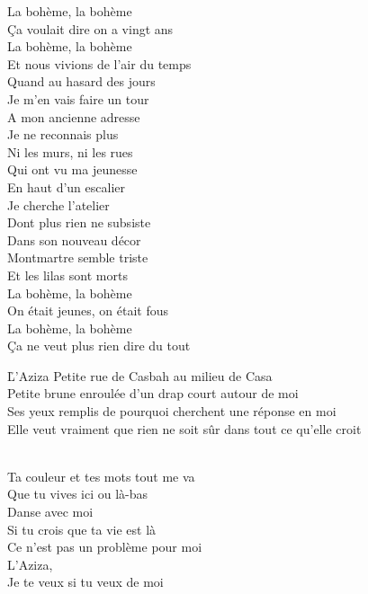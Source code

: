 \documentclass{novel}
\begin{document}
\begin{multicols}{2}
La bohème, la bohème \\
Ça voulait dire on a vingt ans \\
La bohème, la bohème \\
Et nous vivions de l'air du temps \\

Quand au hasard des jours \\
Je m'en vais faire un tour \\
A mon ancienne adresse \\
Je ne reconnais plus \\
Ni les murs, ni les rues \\
Qui ont vu ma jeunesse \\
En haut d'un escalier \\
Je cherche l'atelier \\
Dont plus rien ne subsiste \\
Dans son nouveau décor \\
Montmartre semble triste \\
Et les lilas sont morts \\

La bohème, la bohème \\
On était jeunes, on était fous \\
La bohème, la bohème \\
Ça ne veut plus rien dire du tout \\
\end{multicols}

\newpage
\normalsize

\h*{L’Aziza}
Petite rue de Casbah au milieu de Casa \\
Petite brune enroulée d'un drap court autour de moi \\
Ses yeux remplis de pourquoi cherchent une réponse en moi \\
Elle veut vraiment que rien ne soit sûr dans tout ce qu'elle croit \\

\begin{bfseries}
[Refrain:]\\
Ta couleur et tes mots tout me va \\
Que tu vives ici ou là-bas \\
Danse avec moi \\
Si tu crois que ta vie est là \\
Ce n'est pas un problème pour moi \\
L'Aziza, \\
Je te veux si tu veux de moi \\
\end{bfseries}
\end{document}
